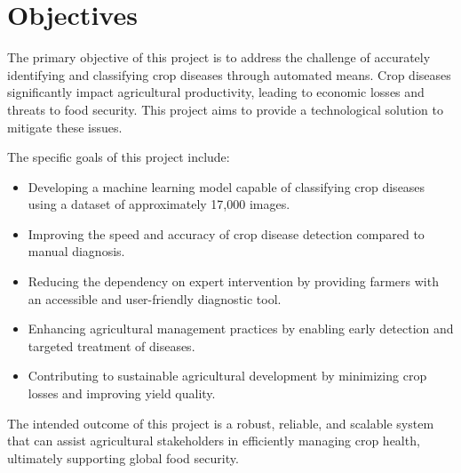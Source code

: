\section{Objectives}
The primary objective of this project is to address the challenge of accurately identifying and classifying crop diseases through automated means. Crop diseases significantly impact agricultural productivity, leading to economic losses and threats to food security. This project aims to provide a technological solution to mitigate these issues.

The specific goals of this project include:
\begin{itemize}
    \item Developing a machine learning model capable of classifying crop diseases using a dataset of approximately 17,000 images.
    \item Improving the speed and accuracy of crop disease detection compared to manual diagnosis.
    \item Reducing the dependency on expert intervention by providing farmers with an accessible and user-friendly diagnostic tool.
    \item Enhancing agricultural management practices by enabling early detection and targeted treatment of diseases.
    \item Contributing to sustainable agricultural development by minimizing crop losses and improving yield quality.
\end{itemize}

The intended outcome of this project is a robust, reliable, and scalable system that can assist agricultural stakeholders in efficiently managing crop health, ultimately supporting global food security.
